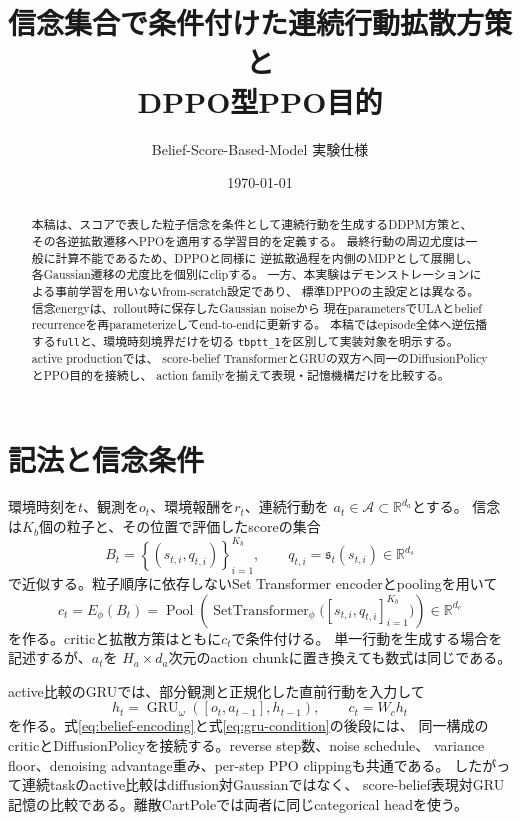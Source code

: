 \documentclass[a4paper,11pt]{article}
\title{信念集合で条件付けた連続行動拡散方策と\\DPPO型PPO目的}
\author{Belief-Score-Based-Model 実験仕様}
\date{\today}
\begin{document}
\maketitle

\begin{abstract}
本稿は、スコアで表した粒子信念を条件として連続行動を生成するDDPM方策と、
その各逆拡散遷移へPPOを適用する学習目的を定義する。
最終行動の周辺尤度は一般に計算不能であるため、DPPO\cite{ren2025dppo}と同様に
逆拡散過程を内側のMDPとして展開し、各Gaussian遷移の尤度比を個別にclipする。
一方、本実験はデモンストレーションによる事前学習を用いないfrom-scratch設定であり、
標準DPPOの主設定とは異なる。信念energyは、rollout時に保存したGaussian noiseから
現在parametersでULAとbelief recurrenceを再parameterizeしてend-to-endに更新する。
本稿ではepisode全体へ逆伝播する\texttt{full}と、環境時刻境界だけを切る
\texttt{tbptt\_1}を区別して実装対象を明示する。active productionでは、
score-belief TransformerとGRUの双方へ同一のDiffusionPolicyとPPO目的を接続し、
action familyを揃えて表現・記憶機構だけを比較する。
\end{abstract}

\section{記法と信念条件}

環境時刻を$t$、観測を$o_t$、環境報酬を$r_t$、連続行動を
$a_t\in\mathcal A\subset\mathbb R^{d_a}$とする。
信念は$K_b$個の粒子と、その位置で評価したscoreの集合
\begin{equation}
  B_t=\left\{\left(s_{t,i},q_{t,i}\right)\right\}_{i=1}^{K_b},
  \qquad q_{t,i}=\mathfrak{s}_t(s_{t,i})\in\mathbb R^{d_s}
  \label{eq:belief-set}
\end{equation}
で近似する。粒子順序に依存しないSet Transformer encoderとpoolingを用いて
\begin{equation}
  c_t=E_\phi(B_t)
  =\operatorname{Pool}\!\left(
    \operatorname{SetTransformer}_\phi
    \bigl([s_{t,i},q_{t,i}]_{i=1}^{K_b}\bigr)
  \right)\in\mathbb R^{d_c}
  \label{eq:belief-encoding}
\end{equation}
を作る。criticと拡散方策はともに$c_t$で条件付ける。
単一行動を生成する場合を記述するが、$a_t$を
$H_a\times d_a$次元のaction chunkに置き換えても数式は同じである。

active比較のGRUでは、部分観測と正規化した直前行動を入力して
\begin{equation}
  h_t=\operatorname{GRU}_{\omega}([o_t,a_{t-1}],h_{t-1}),
  \qquad c_t=W_ch_t
  \label{eq:gru-condition}
\end{equation}
を作る。式\eqref{eq:belief-encoding}と式\eqref{eq:gru-condition}の後段には、
同一構成のcriticとDiffusionPolicyを接続する。reverse step数、noise schedule、
variance floor、denoising advantage重み、per-step PPO clippingも共通である。
したがって連続taskのactive比較はdiffusion対Gaussianではなく、
score-belief表現対GRU記憶の比較である。離散CartPoleでは両者に同じcategorical headを使う。
\end{document}
